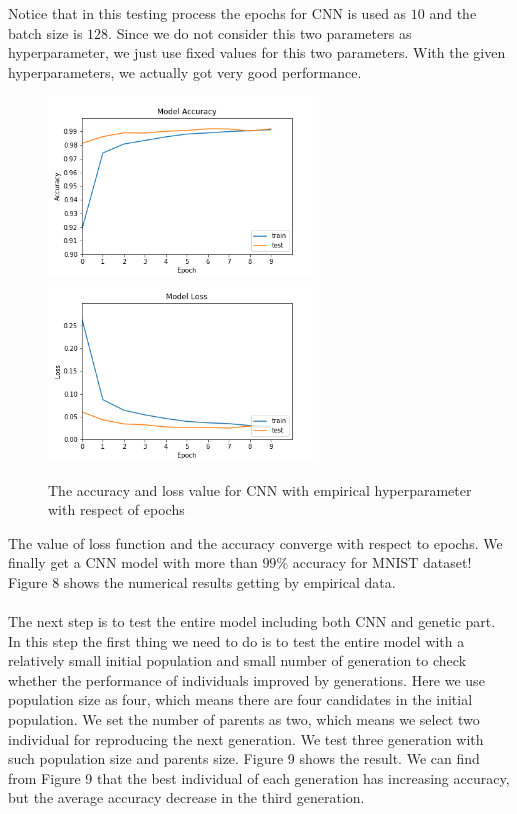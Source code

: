 \documentclass[12pt]{article}
\begin{document}
Notice that in this testing process the epochs for CNN is used as $10$ and the batch size is $128$. Since we do not consider this two parameters as hyperparameter, we just use fixed values for this two parameters. With the given hyperparameters, we actually got very good performance. 
\begin{figure}
\begin{center}
\includegraphics[width =2.82in]{accuracy.png}
\includegraphics[width =2.82in]{loss.png}
\caption{The accuracy and loss value for CNN with empirical hyperparameter with respect of epochs}
\end{center}
\label{fig:pic8}
\end{figure}
The value of loss function and the accuracy converge with respect to epochs. We finally get a CNN model with more than $99\%$ accuracy for MNIST dataset! Figure 8 shows the numerical results getting by empirical data.\\
~\\
The next step is to test the entire model including both CNN and genetic part. In this step the first thing we need to do is to test the entire model with a relatively small initial population and small number of generation to check whether the performance of individuals improved by generations. Here we use population size as four, which means there are four candidates in the initial population. We set the number of parents as two, which means we select two individual for reproducing the next generation. We test three generation with such population size and parents size. Figure 9 shows the result. We can find from Figure 9 that the best individual of each generation has increasing accuracy, but the average accuracy decrease in the third generation. 
\end{document}
